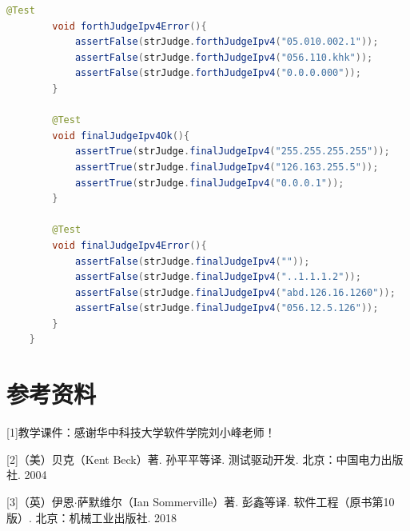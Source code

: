 \documentclass[a4paper]{article}
\begin{document}
\begin{lstlisting}[language={java}]
        @Test
        void forthJudgeIpv4Error(){
            assertFalse(strJudge.forthJudgeIpv4("05.010.002.1"));
            assertFalse(strJudge.forthJudgeIpv4("056.110.khk"));
            assertFalse(strJudge.forthJudgeIpv4("0.0.0.000"));
        }
    
        @Test
        void finalJudgeIpv4Ok(){
            assertTrue(strJudge.finalJudgeIpv4("255.255.255.255"));
            assertTrue(strJudge.finalJudgeIpv4("126.163.255.5"));
            assertTrue(strJudge.finalJudgeIpv4("0.0.0.1"));
        }
    
        @Test
        void finalJudgeIpv4Error(){
            assertFalse(strJudge.finalJudgeIpv4(""));
            assertFalse(strJudge.finalJudgeIpv4("..1.1.1.2"));
            assertFalse(strJudge.finalJudgeIpv4("abd.126.16.1260"));
            assertFalse(strJudge.finalJudgeIpv4("056.12.5.126"));
        }
    }
\end{lstlisting}
\section{参考资料}
[1]教学课件：感谢华中科技大学软件学院刘小峰老师！

[2]（美）贝克（Kent Beck）著. 孙平平等译. 测试驱动开发. 北京：中国电力出版社. 2004

[3]（英）伊恩$\cdot$萨默维尔（Ian Sommerville）著. 彭鑫等译. 软件工程（原书第10版）. 北京：机械工业出版社. 2018
\end{document}
